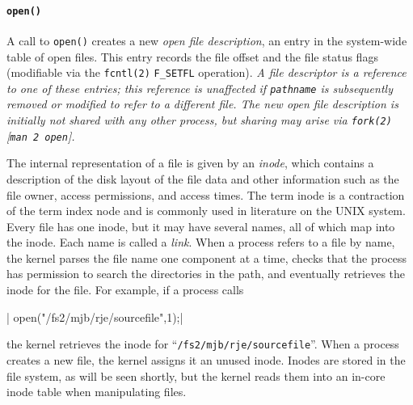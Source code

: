 \paragraph{\texttt{open()}}

A call to \verb|open()| creates a new \emph{open file description}, an entry in the
system-wide table of open files.  This entry records the file offset and the file status
flags (modifiable via the \texttt{fcntl(2)} \verb|F_SETFL| operation). \emph{A file
  descriptor is a reference to one of these entries; this reference is unaffected if
  \texttt{pathname} is subsequently removed or modified to refer to a different file.  The
  new \emph{open file description} is initially not shared with any other process, but
  sharing may arise via \texttt{fork(2)} [\texttt{man 2 open}].}
  
The internal representation of a file is given by an \emph{inode}, which contains a
description of the disk layout of the file data and other information such as the file
owner, access permissions, and access times. The term inode is a contraction of the term
index node and is commonly used in literature on the UNIX system. Every file has one
inode, but it may have several names, all of which map into the inode. Each name is called
a \emph{link}.  When a process refers to a file by name, the kernel parses the file name
one component at a time, checks that the process has permission to search the directories
in the path, and eventually retrieves the inode for the file. For example, if a process
calls

|  open("/fs2/mjb/rje/sourcefile",1);|

the kernel retrieves the inode for ``\verb|/fs2/mjb/rje/sourcefile|''. When a process
creates a new file, the kernel assigns it an unused inode. Inodes are stored in the file
system, as will be seen shortly, but the kernel reads them into an in-core inode table
when manipulating files.

